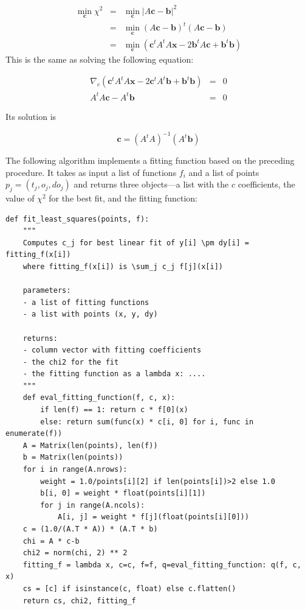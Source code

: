 \documentclass[justified, sixbynine]{tufte-book}
\def\ft{\small\tt}
\theoremstyle{plain}%
\newtheorem * {corollary}{Corollary}
\theoremstyle{definition}
\theoremstyle{remark}
\newtheorem * {remark}{Remark}
\newtheorem * {note}{Note}
\begin{document}
\begin{fullwidth}
\begin{eqnarray}
\min_{\mathbf{c}}\chi^2 &=& \min_{\mathbf{c}} |A\mathbf{c}-\mathbf{b}|^2 \\
  &=& \min_{\mathbf{c}} (A\mathbf{c}-\mathbf{b})^t (A\mathbf{c}-\mathbf{b}) \\
  &=& \min_{\mathbf{c}} (\mathbf{c}^t A^t A \mathbf x - 2\mathbf{b}^t A \mathbf{c} + \mathbf{b}^t \mathbf{b})
\end{eqnarray}
This is the same as solving the following equation:

\begin{eqnarray}
\nabla_{c} (\mathbf{c}^t A^t A \mathbf x - 2\mathbf{c}^t A^t \mathbf{b} + \mathbf{b}^t\mathbf{b}) &=& 0 \\
A^t A \mathbf{c} - A^t \mathbf{b} &=& 0
\end{eqnarray}

Its solution is

\begin{equation}
\mathbf{c} = (A^t A)^{-1} (A^t \mathbf{b})
\end{equation}

The following algorithm implements a fitting function based on the preceding procedure. It takes as input a list of functions $f_i$ and a list of points $p_j=(t_j, o_j, do_j)$ and returns three objects---a list with the $c$ coefficients, the value of $\chi^2$ for the best fit, and the fitting function:

\begin{lstlisting}[caption={in file: {\ft nlib.py}}]
def fit_least_squares(points, f):
    """
    Computes c_j for best linear fit of y[i] \pm dy[i] = fitting_f(x[i])
    where fitting_f(x[i]) is \sum_j c_j f[j](x[i])

    parameters:
    - a list of fitting functions
    - a list with points (x, y, dy)

    returns:
    - column vector with fitting coefficients
    - the chi2 for the fit
    - the fitting function as a lambda x: ....
    """
    def eval_fitting_function(f, c, x):
        if len(f) == 1: return c * f[0](x)
        else: return sum(func(x) * c[i, 0] for i, func in enumerate(f))
    A = Matrix(len(points), len(f))
    b = Matrix(len(points))
    for i in range(A.nrows):
        weight = 1.0/points[i][2] if len(points[i])>2 else 1.0
        b[i, 0] = weight * float(points[i][1])
        for j in range(A.ncols):
            A[i, j] = weight * f[j](float(points[i][0]))
    c = (1.0/(A.T * A)) * (A.T * b)
    chi = A * c-b
    chi2 = norm(chi, 2) ** 2
    fitting_f = lambda x, c=c, f=f, q=eval_fitting_function: q(f, c, x)
    cs = [c] if isinstance(c, float) else c.flatten()
    return cs, chi2, fitting_f


\end{lstlisting}
\end{fullwidth}
\end{document}
